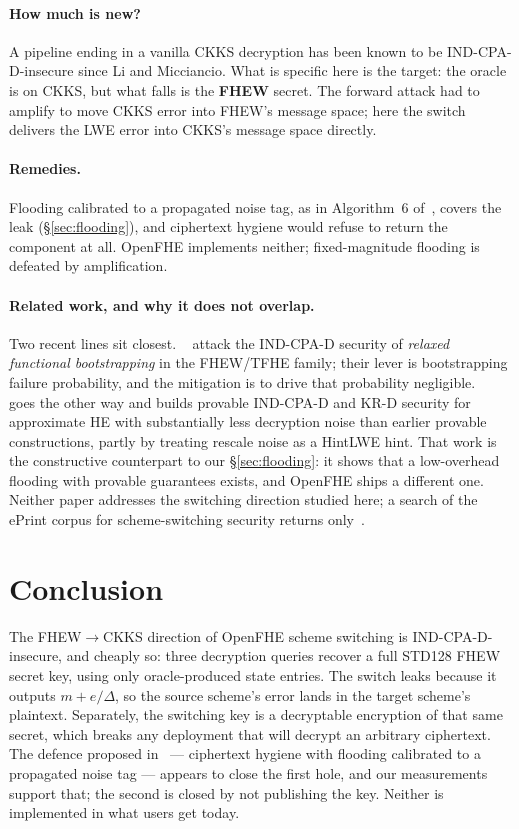 \documentclass[11pt]{article}
\newcommand{\fto}{\texorpdfstring{FHEW$\to$CKKS}{FHEW-to-CKKS}}
\begin{document}
\paragraph{How much is new?}
A pipeline ending in a vanilla
CKKS decryption has been known to be IND-CPA-D-insecure since Li and Micciancio. What is specific
here is the target: the oracle is on CKKS, but what falls is the \textbf{FHEW} secret. The forward
attack had to amplify to move CKKS error into FHEW's message space; here the switch delivers the
LWE error into CKKS's message space directly.

\paragraph{Remedies.}
Flooding calibrated to a propagated noise tag, as in Algorithm~6
of~\cite{santato2026}, covers the leak (\S\ref{sec:flooding}), and ciphertext hygiene would
refuse to return the component at all. OpenFHE implements neither; fixed-magnitude flooding is
defeated by amplification.

\paragraph{Related work, and why it does not overlap.}
Two recent lines sit closest. \citeauthor{liu2025}~\cite{liu2025} attack the IND-CPA-D security of
\emph{relaxed functional bootstrapping} in the FHEW/TFHE family; their lever is bootstrapping
failure probability, and the mitigation is to drive that probability
negligible. \citeauthor{ogilvie2025}~\cite{ogilvie2025} goes the other way and builds provable
IND-CPA-D and KR-D security for approximate HE with substantially less decryption noise than earlier
provable constructions, partly by treating rescale noise as a HintLWE hint. That work is the
constructive counterpart to our \S\ref{sec:flooding}: it shows that a low-overhead
flooding with provable guarantees exists, and OpenFHE ships a different one. Neither
paper addresses the switching direction studied here; a search of the ePrint corpus for
scheme-switching security returns only~\cite{santato2026}.

\section{Conclusion}

The \fto{} direction of OpenFHE scheme switching is IND-CPA-D-insecure, and cheaply so: three
decryption queries recover a full STD128 FHEW secret key, using only oracle-produced state entries.
The switch leaks because it outputs $m + e/\Delta$, so the source
scheme's error lands in the target scheme's plaintext. Separately, the switching key is a
decryptable encryption of that same secret, which breaks any deployment that will decrypt an
arbitrary ciphertext. The defence proposed in~\cite{santato2026} --- ciphertext hygiene with
flooding calibrated to a propagated noise tag --- appears to close the first hole, and our
measurements support that; the second is closed by not publishing the key. Neither is implemented
in what users get today.



\end{document}
